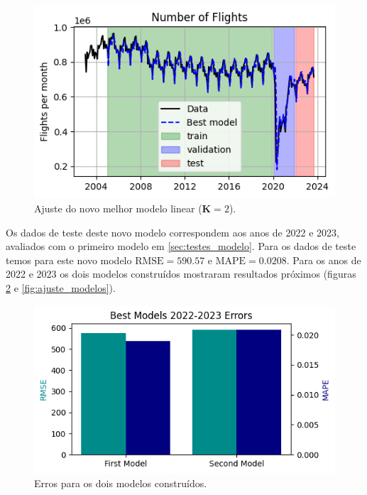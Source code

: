 \documentclass[final,5p]{elsarticle}
\numberwithin{equation}{section}
\begin{document}
        \begin{figure}[hbt!]
            \includegraphics[width=0.95\columnwidth]{C2_BestModelFit.png}
            \caption{Ajuste do novo melhor modelo linear ($\textbf{K} = 2$).}
            \label{fig:ajuste_novo}
        \end{figure}

        Os dados de teste deste novo modelo correspondem aos anos de 2022 e 2023, avaliados com o primeiro modelo em \ref{sec:testes_modelo}. Para os dados de teste temos para este novo modelo $\text{RMSE} = 590.57$ e $\text{MAPE} = 0.0208$. Para os anos de 2022 e 2023 os dois modelos construídos mostraram resultados próximos (figuras \ref{fig:erros_modelos} e \ref{fig:ajuste_modelos}).

        \begin{figure}[hbt!]
            \includegraphics[width=0.95\columnwidth]{C3_RMSE.png}
            \caption{Erros para os dois modelos construídos.}
            \label{fig:erros_modelos}
        \end{figure}
\end{document}
